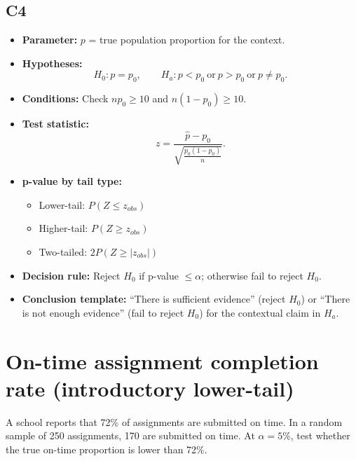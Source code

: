 \subsection*{C4}
\begin{itemize}
    \item \textbf{Parameter:} \(p\) = true population proportion for the context.
    \item \textbf{Hypotheses:}
    \[
    H_0\colon p=p_0,\qquad
    H_a\colon p<p_0\ \text{or}\ p>p_0\ \text{or}\ p\ne p_0.
    \]
    \item \textbf{Conditions:} Check \(np_0\ge 10\) and \(n(1-p_0)\ge 10\).
    \item \textbf{Test statistic:}
    \[
    z=\frac{\hat p-p_0}{\sqrt{\frac{p_0(1-p_0)}{n}}}.
    \]
    \item \textbf{p-value by tail type:}
    \begin{itemize}
        \item Lower-tail: \(P(Z\le z_{obs})\)
        \item Higher-tail: \(P(Z\ge z_{obs})\)
        \item Two-tailed: \(2P(Z\ge |z_{obs}|)\)
    \end{itemize}
    \item \textbf{Decision rule:} Reject \(H_0\) if p-value \(\le \alpha\); otherwise fail to reject \(H_0\).
    \item \textbf{Conclusion template:} ``There is sufficient evidence'' (reject \(H_0\)) or ``There is not enough evidence'' (fail to reject \(H_0\)) for the contextual claim in \(H_a\).
\end{itemize}

\begin{center}
\hspace{0.8cm}
\hspace{0.8cm}
\end{center}


\section{On-time assignment completion rate (introductory lower-tail)}
A school reports that 72\% of assignments are submitted on time. In a random sample of 250 assignments, 170 are submitted on time. At \(\alpha=5\%\), test whether the true on-time proportion is lower than 72\%.

